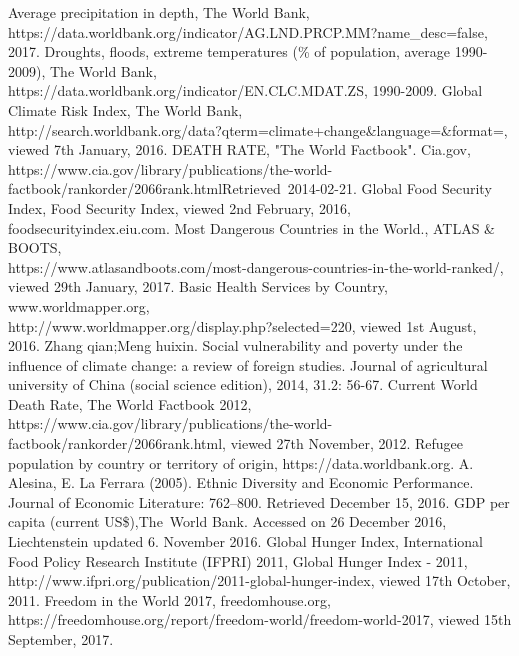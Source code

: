 \documentclass{mcmthesis}
\begin{document}
\begin{thebibliography}{99}
 Average precipitation in depth, The World Bank, \\ https://data.worldbank.org/indicator/AG.LND.PRCP.MM?name\_desc=false, 2017.
 Droughts, floods, extreme temperatures (\% of population, average 1990-2009), The World Bank, https://data.worldbank.org/indicator/EN.CLC.MDAT.ZS, 1990-2009.
 Global Climate Risk Index, The World Bank,\\http://search.worldbank.org/data?qterm=climate+change\&language=\&format=, viewed 7th January, 2016.
 DEATH RATE, "The World Factbook". Cia.gov, \\https://www.cia.gov/library/publications/the-world-factbook/rankorder/2066rank.htmlRetrieved 2014-02-21.
 Global Food Security Index, Food Security Index, viewed 2nd February, 2016, foodsecurityindex.eiu.com.
 Most Dangerous Countries in the World., ATLAS \& BOOTS,\\ https://www.atlasandboots.com/most-dangerous-countries-in-the-world-ranked/, viewed 29th January, 2017.
 Basic Health Services by Country, www.worldmapper.org, \\http://www.worldmapper.org/display.php?selected=220, viewed 1st August, 2016.
 Zhang qian;Meng huixin. Social vulnerability and poverty under the influence of climate change: a review of foreign studies. Journal of agricultural university of China (social science edition), 2014, 31.2: 56-67.
 Current World Death Rate, The World Factbook 2012,\\ https://www.cia.gov/library/publications/the-world-factbook/rankorder/2066rank.html, viewed 27th November, 2012.
 Refugee population by country or territory of origin, https://data.worldbank.org.
 A. Alesina, E. La Ferrara (2005). Ethnic Diversity and Economic Performance. Journal of Economic Literature: 762–800. Retrieved December 15, 2016.
 GDP per capita (current US\$),The World Bank. Accessed on 26 December 2016, Liechtenstein updated 6. November 2016.
 Global Hunger Index, International Food Policy Research Institute (IFPRI) 2011, Global Hunger Index - 2011, \\http://www.ifpri.org/publication/2011-global-hunger-index, viewed 17th October, 2011.
 Freedom in the World 2017, freedomhouse.org,\\ https://freedomhouse.org/report/freedom-world/freedom-world-2017, viewed 15th September, 2017.

\end{thebibliography}
\end{document}
